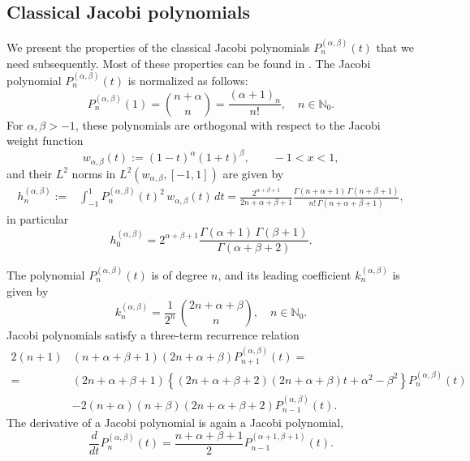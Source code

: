 \documentclass{amsart}
\theoremstyle{plain}%
\theoremstyle{definition}
\theoremstyle{remark}
\begin{document}
\subsection{Classical Jacobi polynomials}
We present the properties of the classical Jacobi polynomials $P_n^{(\alpha,\beta)}(t)$ that we need subsequently. Most of these properties can be found in \cite{Sz}. The Jacobi polynomial $P_n^{(\alpha, \beta)}(t)$ is normalized as follows: 
\begin{equation} \label{jac-norm}
P_n^{(\alpha,\beta)}(1) = \binom{n+\alpha}{n} = \frac{(\alpha+1)_n}{n!}, \quad n \in \mathbb{N}_0.
\end{equation}
For $\alpha, \beta > -1$, these 
polynomials are orthogonal with respect to the Jacobi weight function
$$
   w_{\alpha,\beta}(t) := (1-t)^\alpha(1+t)^{\beta}, \qquad  -1< x < 1,
$$
and their $L^2$ norms in $L^2(w_{\alpha,\beta}, [-1,1])$ are given by 
\begin{align}\label{normJ}
h_n^{(\alpha,\beta)} := & \int_{-1}^1 P_{n}^{(\alpha, \beta)}(t)^2 \, w_{\alpha,\beta}(t)\,dt 
 = \frac{2^{\alpha+\beta+1}}{2n+\alpha+\beta+1} \frac{\Gamma(n+\alpha+1)\,\Gamma(n+\beta+1)}{n!\,\Gamma(n+\alpha+\beta+1)},
\end{align}
in particular \[h_0^{(\alpha,\beta)} = 2^{\alpha+\beta+1} 
\dfrac{\Gamma(\alpha+1)\,\Gamma(\beta+1)}{\Gamma(\alpha+\beta+2)}.\]

The polynomial $P_n^{(\alpha,\beta)}(t)$ is of degree $n$, and its leading coefficient $k_n^{(\alpha,\beta)}$
is given by 
\begin{equation}\label{leadingcoef}
k_n^{(\alpha,\beta)} = \frac{1}{2^n}\, \binom{2n + \alpha + \beta}{n}, \quad n \in \mathbb{N}_0.
\end{equation}
Jacobi polynomials satisfy a three-term recurrence relation
\begin{align}
2(n+1) &(n + \alpha+\beta+1) (2n + \alpha+\beta) P_{n+1}^{(\alpha,\beta)}(t) = \nonumber\\
= & (2n + \alpha+\beta+1) \left\{(2n + \alpha+\beta+2)(2n + \alpha+\beta) t + \alpha^2-\beta^2\right\}P_n^{(\alpha,\beta)}(t) \label{three-term}\\
  &- 2(n+\alpha) (n + \beta) (2n + \alpha+\beta+2) P_{n-1}^{(\alpha,\beta)}(t). \nonumber
\end{align}
The derivative of a Jacobi polynomial is again a Jacobi polynomial, 
\begin{equation}\label{derJ}
\frac{d}{d t} P_n^{(\alpha,\beta)}(t) = \frac{n+\alpha + \beta+1}{2} P_{n-1}^{(\alpha+1,\beta+1)}(t).
\end{equation}
\end{document}
